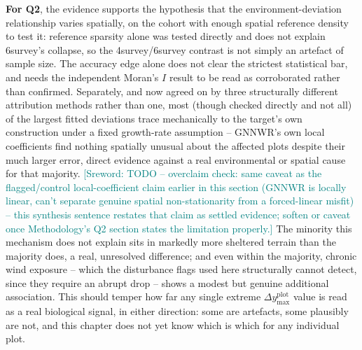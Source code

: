 \documentclass[logo,msc,ai]{infthesis}           %
\newcommand{\sr}[1]{\textcolor{teal}{[Sreword: #1]}}
\begin{document}
\textbf{For Q2}, the evidence supports the hypothesis that the environment-deviation
relationship varies spatially, on the cohort with enough spatial reference density
to test it: reference sparsity alone was tested directly and does not explain
6survey's collapse, so the 4survey/6survey contrast is not simply an artefact of
sample size. The accuracy edge alone does not clear the strictest statistical bar,
and needs the independent Moran's $I$ result to be read as corroborated rather than
confirmed. Separately, and now agreed on by three structurally different
attribution methods rather than one, most (though checked directly and not all)
of the largest fitted deviations trace mechanically to the target's own
construction under a fixed growth-rate assumption -- GNNWR's own local
coefficients find nothing spatially unusual about the affected plots despite
their much larger error, direct evidence against a real environmental or spatial
cause for that majority.
\sr{TODO -- overclaim check: same caveat as the flagged/control local-coefficient
claim earlier in this section (GNNWR is locally linear, can't separate genuine
spatial non-stationarity from a forced-linear misfit) -- this synthesis sentence
restates that claim as settled evidence; soften or caveat once Methodology's Q2
section states the limitation properly.} The minority this mechanism does not explain sits in
markedly more sheltered terrain than the majority does, a real, unresolved
difference; and even within the majority, chronic wind exposure -- which the
disturbance flags used here structurally cannot detect, since they require an
abrupt drop -- shows a modest but genuine additional association. This should
temper how far any single extreme \(\Delta y_{\max}^{\text{plot}}\) value is
read as a real biological signal, in either direction: some are artefacts, some
plausibly are not, and this chapter does not yet know which is which for any
individual plot.
\end{document}
